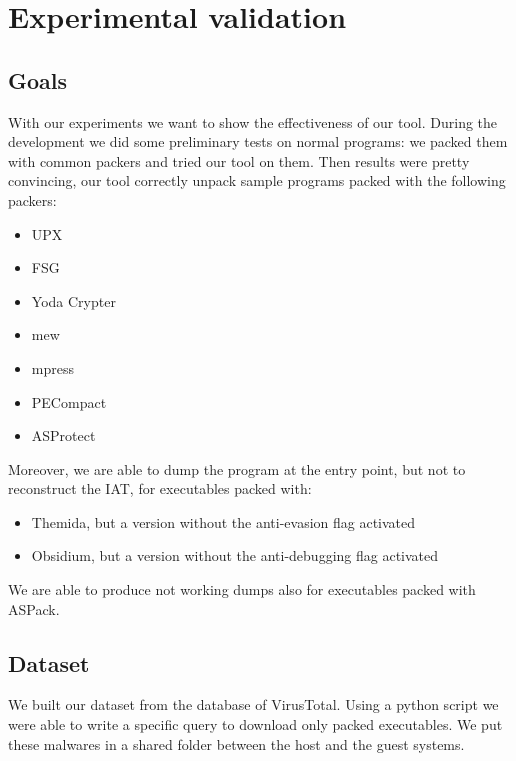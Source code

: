 \chapter{Experimental validation}
\label{chapter5}
\thispagestyle{empty}

\section{Goals}
With our experiments we want to show the effectiveness of our tool. During the development we did some preliminary tests on normal programs: we packed them with common packers and tried our tool on them. Then results were pretty convincing, our tool correctly unpack sample programs packed with the following packers:
\begin{itemize}
\item UPX
\item FSG
\item Yoda Crypter
\item mew
\item mpress
\item PECompact
\item ASProtect
\end{itemize}
Moreover, we are able to dump the program at the entry point, but not to reconstruct the IAT, for executables packed with:
\begin{itemize}
\item Themida, but a version without the anti-evasion flag activated
\item Obsidium, but a version without the anti-debugging flag activated
\end{itemize}
We are able to produce not working dumps also for executables packed with ASPack.

\section{Dataset}
We built our dataset from the database of VirusTotal. Using a python script we were able to write a specific query to download only packed executables. We put these malwares in a shared folder between the host and the guest systems.


